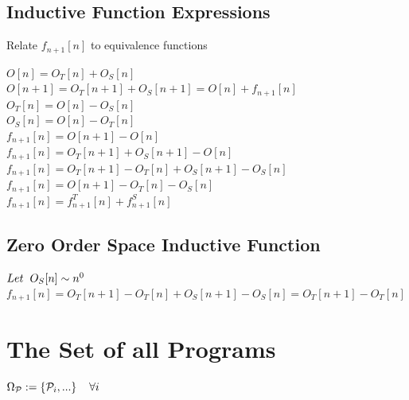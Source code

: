 \documentclass[11pt]{article}
\begin{document}
\subsection{Inductive Function Expressions}
Relate $f_{n+1}[n]$ to equivalence functions
\begin{center}
\vspace{2mm}
$
O[n] = O_T[n] + O_S[n]
$
\\ \vspace{2mm}
$
O[n+1] = O_T[n+1] + O_S[n+1] = O[n] + f_{n+1}[n]
$
\\ \vspace{2mm}
$
O_T[n] = O[n] - O_S[n]
$
\\ \vspace{2mm}
$
O_S[n] = O[n] - O_T[n]
$
\\ \vspace{8mm}
$
f_{n+1}[n] = O[n+1] - O[n]
$
\\ \vspace{2mm}
$
f_{n+1}[n] = O_T[n+1] + O_S[n+1] - O[n]
$
\\ \vspace{2mm}
$
f_{n+1}[n] = O_T[n+1] - O_T[n] + O_S[n+1] - O_S[n]
$
\\ \vspace{2mm}
$
f_{n+1}[n] = O[n+1] - O_T[n] - O_S[n]
$
\\ \vspace{2mm}
$
f_{n+1}[n] =  f^T_{n+1}[n] +  f^S_{n+1}[n]
$
\end{center}






\subsection{Zero Order Space Inductive Function}
\begin{center}
$
Let \hspace{2mm} O_S[n] \sim n^0
$
\\ \vspace{2mm}
$
f_{n+1}[n] = O_T[n+1] - O_T[n] + O_S[n+1] - O_S[n] = O_T[n+1] - O_T[n]
$
\end{center}


\newpage
\section{The Set of all Programs}

\begin{center}
$
\Omega_{\mathcal{P}} := \{\mathcal{P}_i,...\} \hspace{4mm} \forall i
$
\end{center}
\end{document}
